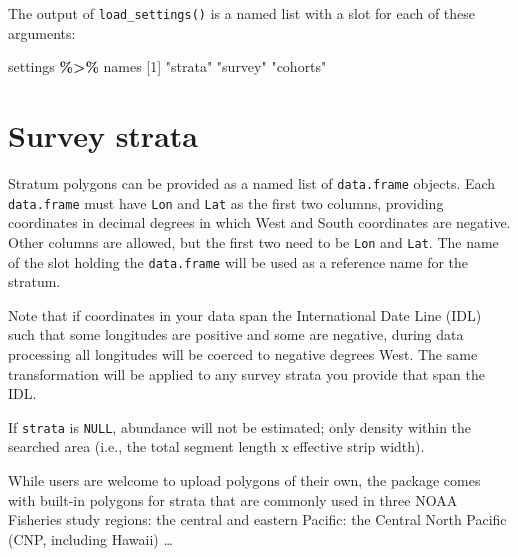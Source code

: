 \documentclass[
]{book}
\newenvironment{Shaded}{\begin{snugshade}}{\end{snugshade}}
\newcommand{\DecValTok}[1]{\textcolor[rgb]{0.00,0.00,0.81}{#1}}
\newcommand{\NormalTok}[1]{#1}
\newcommand{\SpecialCharTok}[1]{\textcolor[rgb]{0.81,0.36,0.00}{\textbf{#1}}}
\newcommand{\StringTok}[1]{\textcolor[rgb]{0.31,0.60,0.02}{#1}}
\begin{document}
The output of \texttt{load\_settings()} is a named list with a slot for each of these arguments:

\begin{Shaded}
\begin{Highlighting}[]
\NormalTok{settings }\SpecialCharTok{\%\textgreater{}\%}\NormalTok{ names}
\NormalTok{[}\DecValTok{1}\NormalTok{] }\StringTok{"strata"}  \StringTok{"survey"}  \StringTok{"cohorts"}
\end{Highlighting}
\end{Shaded}

\hypertarget{survey-strata}{%
\section*{Survey strata}\label{survey-strata}}

Stratum polygons can be provided as a named list of \texttt{data.frame} objects. Each \texttt{data.frame} must have \texttt{Lon} and \texttt{Lat} as the first two columns, providing coordinates in decimal degrees in which West and South coordinates are negative. Other columns are allowed, but the first two need to be \texttt{Lon} and \texttt{Lat}. The name of the slot holding the \texttt{data.frame} will be used as a reference name for the stratum.

Note that if coordinates in your data span the International Date Line (IDL) such that some longitudes are positive and some are negative, during data processing all longitudes will be coerced to negative degrees West. The same transformation will be applied to any survey strata you provide that span the IDL.

If \texttt{strata} is \texttt{NULL}, abundance will not be estimated; only density within the searched area (i.e., the total segment length x effective strip width).

While users are welcome to upload polygons of their own, the package comes with built-in polygons for strata that are commonly used in three NOAA Fisheries study regions: the central and eastern Pacific: the Central North Pacific (CNP, including Hawaii) \ldots{}
\end{document}
